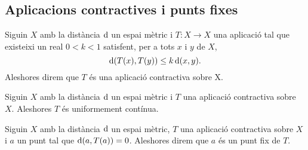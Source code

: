 \documentclass[../../Main.tex]{subfiles}
\begin{document}
	\subsection{Aplicacions contractives i punts fixes}
	\begin{definition}
		\label{def:aplicació contractiva}
		Siguin \(X\) amb la distància \(\operatorname{d}\) un espai mètric i \(T\colon X\longrightarrow X\) una aplicació tal que existeixi un real \(0<k<1\) satisfent, per a tots \(x\) i \(y\) de \(X\),
		\[
		    \operatorname{d}(T(x),T(y))\leq k\operatorname{d}(x,y).
		\]
		Aleshores direm que \(T\) és una aplicació contractiva sobre X.
	\end{definition}
	\begin{observation}
		\label{obs:les aplicacions contractives són uniformement contínues}
		Siguin \(X\) amb la distància \(\operatorname{d}\) un espai mètric i \(T\) una aplicació contractiva sobre \(X\).
		Aleshores \(T\) és uniformement contínua.
	\end{observation}
	\begin{definition}
		\label{def:punt fix d'un aplicació contractiva}
		Siguin \(X\) amb la distància \(\operatorname{d}\) un espai mètric, \(T\) una aplicació contractiva sobre \(X\) i \(a\) un punt tal que \(\operatorname{d}(a,T(a))=0\).
		Aleshores direm que \(a\) és un punt fix de \(T\).
	\end{definition}
\end{document}
